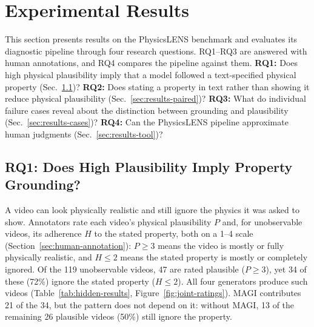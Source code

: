 
\section{Experimental Results}
\label{sec:results}

This section presents results on the PhysicsLENS benchmark and evaluates its diagnostic pipeline through four research questions. RQ1--RQ3 are answered with human annotations, and RQ4 compares the pipeline against them. \textbf{RQ1:} Does high physical plausibility imply that a model followed a text-specified physical property (Sec.~\ref{sec:results-grounding})? \textbf{RQ2:} Does stating a property in text rather than showing it reduce physical plausibility (Sec.~\ref{sec:results-paired})? \textbf{RQ3:} What do individual failure cases reveal about the distinction between grounding and plausibility (Sec.~\ref{sec:results-cases})? \textbf{RQ4:} Can the PhysicsLENS pipeline approximate human judgments (Sec.~\ref{sec:results-tool})?

\subsection{RQ1: Does High Plausibility Imply Property Grounding?}
\label{sec:results-grounding}
A video can look physically realistic and still ignore the physics it was asked to show. Annotators rate each video's physical plausibility $P$ and, for unobservable videos, its adherence $H$ to the stated property, both on a 1--4 scale (Section~\ref{sec:human-annotation}): $P \geq 3$ means the video is mostly or fully physically realistic, and $H \leq 2$ means the stated property is mostly or completely ignored. Of the 119 unobservable videos, 47 are rated plausible ($P \geq 3$), yet 34 of these (72\%) ignore the stated property ($H \leq 2$). All four generators produce such videos (Table~\ref{tab:hidden-results}, Figure~\ref{fig:joint-ratings}). MAGI contributes 21 of the 34, but the pattern does not depend on it: without MAGI, 13 of the remaining 26 plausible videos (50\%) still ignore the property.

